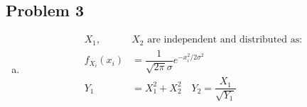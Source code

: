 \documentclass{article}
\begin{document}
\begin{flushleft}
\section*{Problem 3}
\begin{enumerate}[(a)]
\item 
\begin{align*}
X_1,& X_2 \text{ are independent and distributed as:}\\
f_{X_i}(x_i)&=\dfrac{1}{\sqrt{2\pi}\sigma}e^{-x_i^2/2\sigma^2}\\
Y_1&=X_1^2+X_2^2 \quad Y_2=\dfrac{X_1}{\sqrt{Y_1}}\\
\end{align*}
\end{enumerate}



\end{flushleft}
\end{document}
